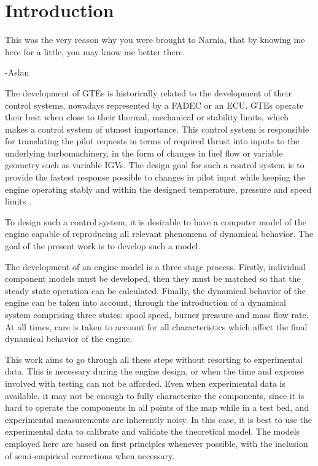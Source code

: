 \documentclass[tcc]{subfiles}
\begin{document}
\chapter{Introduction}
\label{ch:intro}
\epigraph{This was the very reason why you were brought to Narnia, that by knowing me here for a little, you may know me better there.}{-Aslan}

The development of \acp{GTE} is historically related to the development of their control systems, 
nowadays represented by a \ac{FADEC} or an \ac{ECU}. \Acp{GTE} operate their best when close to their
thermal, mechanical or stability limits, which makes a control system of utmost importance.
This control system is responsible for translating the pilot requests in terms of required thrust 
into inputs to the underlying turbomachinery, 
in the form of changes in fuel flow or variable geometry such as variable \acp{IGV}.
The design goal for such a control system is to provide the fastest response possible to changes in pilot input
while keeping the engine operating stably and within the designed temperature, pressure and speed limits
\cite{AustinSpangIII1999}.

To design such a control system, it is desirable to have a computer model of the engine 
capable of reproducing all relevant phenomena of dynamical behavior. 
The goal of the present work is to develop such a model. 

The development of an engine model is a three stage process. 
Firstly, individual component models must be developed, 
then they must be matched so that the steady state operation can be calculated.
Finally, the dynamical behavior of the engine can be taken into account, 
through the introduction of a dynamical system comprising three states: 
spool speed, burner pressure and mass flow rate. 
At all times, care is taken to account for all characteristics which affect the final dynamical behavior of the engine.

This work aims to go through all these steps without resorting to experimental data.
This is necessary during the engine design, or when the time and expense involved with testing can not be afforded.
Even when experimental data is available, it may not be enough to fully characterize the components,
since it is hard to operate the components in all points of the map while in a test bed, 
and experimental measurements are inherently noisy. 
In this case, it is best to use the experimental data to calibrate and validate the theoretical model.
The models employed here are based on first principles whenever possible, 
with the inclusion of semi-empirical corrections when necessary. 
\end{document}
